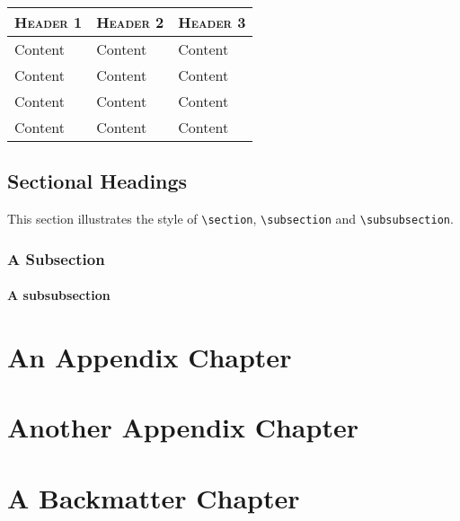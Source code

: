 \documentclass[a4paper,11pt,oneside,showtrims]{alpenthesis}
\begin{document}
\lipsum[3]

\begin{center}
    \label{tab:outside}
    \begin{tabular}{lll}
        \toprule
        \scshape Header 1 & \scshape Header 2 & \scshape Header 3 \\
        \midrule
        Content           & Content           & Content           \\
        Content           & Content           & Content           \\
        Content           & Content           & Content           \\
        Content           & Content           & Content           \\
        \bottomrule
    \end{tabular}
\end{center}

\section{Sectional Headings}

This section illustrates the  style of \verb|\section|, \verb|\subsection| and
\verb|\subsubsection|.

\subsection{A Subsection}

\lipsum[1]

\subsubsection{A subsubsection}

\lipsum[2]

\appendix{}
\chapter{An Appendix Chapter}
\lipsum[1-3]

\chapter{Another Appendix Chapter}
\lipsum[4-6]

\backmatter
\chapter{A Backmatter Chapter}
\lipsum[7-9]

\end{document}
